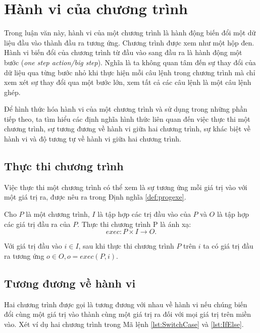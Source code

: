 \section{Hành vi của chương trình }
\label{sec:behavior}

Trong luận văn này, hành vi của một chương trình là hành động biến đổi
một dữ liệu đầu vào thành đầu ra tương ứng. Chương trình được xem như
một hộp đen. Hành vi biến đổi của chương trình từ đầu vào sang đầu ra
là hành động một bước (\emph{one step action/big step}). Nghĩa là ta
không quan tâm đến sự thay đổi của dữ liệu qua từng bước nhỏ khi thực
hiện mỗi câu lệnh trong chương trình mà chỉ xem xét sự thay đổi qua
một bước lớn, xem tất cả các câu lệnh là một câu lệnh ghép.

Để hình thức hóa hành vi của một chương trình và sử dụng trong những
phần tiếp theo, ta tìm hiểu các định nghĩa hình thức liên quan đến
việc thực thi một chương trình, sự tương đương về hành vi giữa hai
chương trình, sự khác biệt về hành vi và độ tương tự về hành vi giữa
hai chương trình.
        
\subsection{Thực thi chương trình}

Việc thực thi một chương trình có thể xem là sự tương ứng mỗi giá trị vào với một giá trị ra, được nêu ra trong Định nghĩa \ref{def:progexe}.

\begin{definition}
  \label{def:progexe}
  Cho $P$ là một chương trình, $I$ là tập hợp các trị đầu vào của $P$
  và $O$ là tập hợp các giá trị đầu ra của $P$. Thực thi chương trình
  P là ánh xạ:
  \[exec: P \times I \rightarrow O.
  \]
\end{definition}

Với giá trị đầu vào $i \in I$, sau khi thực thi chương trình $P$ trên
$i$ ta có giá trị đầu ra tương ứng $o \in O, o = exec(P, i)$.

\subsection{Tương đương về hành vi}

Hai chương trình được gọi là tương đương với nhau về hành vi nếu chúng
biến đổi cùng một giá trị vào thành cùng một giá trị ra đối với mọi
giá trị trên miền vào. Xét ví dụ hai chương trình trong Mã lệnh
\ref{lst:SwitchCase} và \ref{lst:IfElse}.

